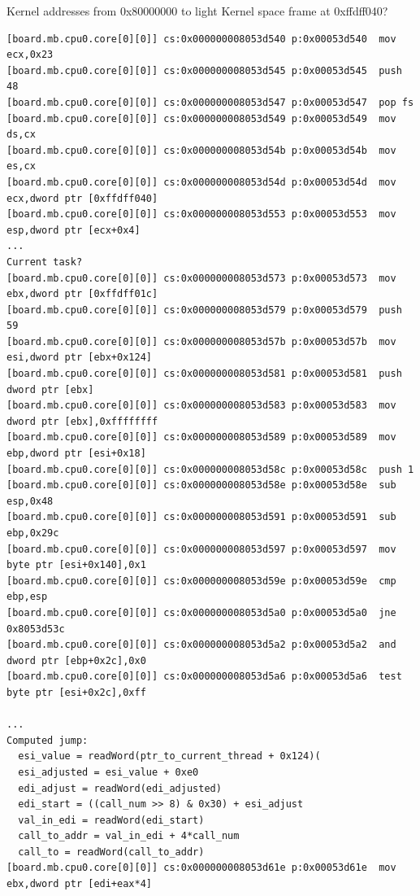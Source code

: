 \documentclass[titlepage]{article}
\begin{document}
\begin{appendices}
Kernel addresses from 0x80000000 to light
Kernel space frame at 0xffdff040?
\begin{verbatim}
[board.mb.cpu0.core[0][0]] cs:0x000000008053d540 p:0x00053d540  mov ecx,0x23
[board.mb.cpu0.core[0][0]] cs:0x000000008053d545 p:0x00053d545  push 48
[board.mb.cpu0.core[0][0]] cs:0x000000008053d547 p:0x00053d547  pop fs
[board.mb.cpu0.core[0][0]] cs:0x000000008053d549 p:0x00053d549  mov ds,cx
[board.mb.cpu0.core[0][0]] cs:0x000000008053d54b p:0x00053d54b  mov es,cx
[board.mb.cpu0.core[0][0]] cs:0x000000008053d54d p:0x00053d54d  mov ecx,dword ptr [0xffdff040]
[board.mb.cpu0.core[0][0]] cs:0x000000008053d553 p:0x00053d553  mov esp,dword ptr [ecx+0x4]
...
Current task?
[board.mb.cpu0.core[0][0]] cs:0x000000008053d573 p:0x00053d573  mov ebx,dword ptr [0xffdff01c]
[board.mb.cpu0.core[0][0]] cs:0x000000008053d579 p:0x00053d579  push 59
[board.mb.cpu0.core[0][0]] cs:0x000000008053d57b p:0x00053d57b  mov esi,dword ptr [ebx+0x124]
[board.mb.cpu0.core[0][0]] cs:0x000000008053d581 p:0x00053d581  push dword ptr [ebx]
[board.mb.cpu0.core[0][0]] cs:0x000000008053d583 p:0x00053d583  mov dword ptr [ebx],0xffffffff
[board.mb.cpu0.core[0][0]] cs:0x000000008053d589 p:0x00053d589  mov ebp,dword ptr [esi+0x18]
[board.mb.cpu0.core[0][0]] cs:0x000000008053d58c p:0x00053d58c  push 1
[board.mb.cpu0.core[0][0]] cs:0x000000008053d58e p:0x00053d58e  sub esp,0x48
[board.mb.cpu0.core[0][0]] cs:0x000000008053d591 p:0x00053d591  sub ebp,0x29c
[board.mb.cpu0.core[0][0]] cs:0x000000008053d597 p:0x00053d597  mov byte ptr [esi+0x140],0x1
[board.mb.cpu0.core[0][0]] cs:0x000000008053d59e p:0x00053d59e  cmp ebp,esp
[board.mb.cpu0.core[0][0]] cs:0x000000008053d5a0 p:0x00053d5a0  jne 0x8053d53c
[board.mb.cpu0.core[0][0]] cs:0x000000008053d5a2 p:0x00053d5a2  and dword ptr [ebp+0x2c],0x0
[board.mb.cpu0.core[0][0]] cs:0x000000008053d5a6 p:0x00053d5a6  test byte ptr [esi+0x2c],0xff

...
Computed jump:
  esi_value = readWord(ptr_to_current_thread + 0x124)(
  esi_adjusted = esi_value + 0xe0
  edi_adjust = readWord(edi_adjusted)
  edi_start = ((call_num >> 8) & 0x30) + esi_adjust
  val_in_edi = readWord(edi_start)
  call_to_addr = val_in_edi + 4*call_num
  call_to = readWord(call_to_addr)
[board.mb.cpu0.core[0][0]] cs:0x000000008053d61e p:0x00053d61e  mov ebx,dword ptr [edi+eax*4]


\end{verbatim}
\end{appendices}
\end{document}
